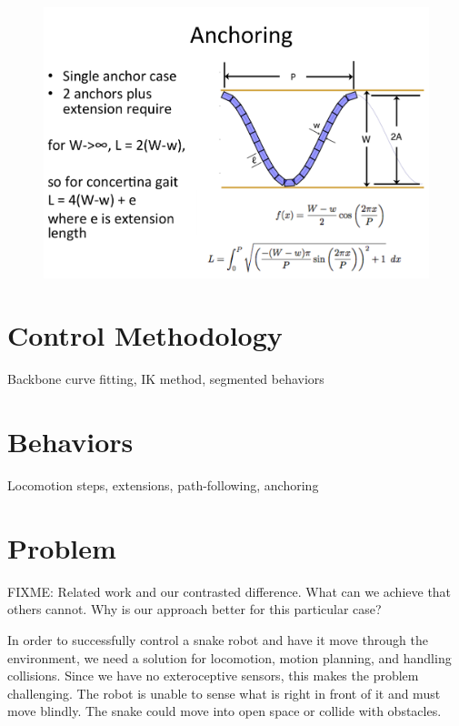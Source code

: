 \begin{figure}[htbp]
\centering
\includegraphics[keepaspectratio,width=\textwidth,height=0.75\textheight]{PastedGraphic6.pdf}
\label{pastedgraphic6.pdf}
\end{figure}




\section{Control Methodology}
\label{controlmethodology}

Backbone curve fitting, IK method, segmented behaviors

\section{Behaviors}
\label{control:behaviors}

Locomotion steps, extensions, path-following, anchoring

\section{Problem}
\label{control:problem}

FIXME: Related work and our contrasted difference. What can we achieve that others cannot. Why is our approach better for this particular case? 

In order to successfully control a snake robot and have it move through the environment, we need a solution for locomotion, motion planning, and handling collisions. Since we have no exteroceptive sensors, this makes the problem challenging. The robot is unable to sense what is right in front of it and must move blindly. The snake could move into open space or collide with obstacles.

